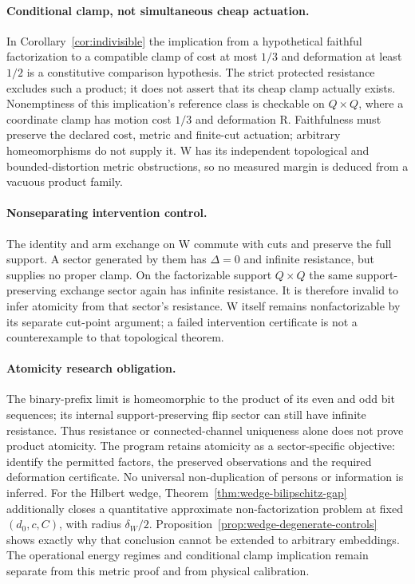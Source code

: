 \documentclass[11pt,a4paper]{article}
\theoremstyle{plain}
\theoremstyle{definition}
\theoremstyle{remark}
\begin{document}
\paragraph{Conditional clamp, not simultaneous cheap actuation.}
In Corollary~\ref{cor:indivisible} the implication from a hypothetical faithful
factorization to a compatible clamp of cost at most $1/3$ and deformation at
least $1/2$ is a constitutive comparison hypothesis. The strict protected
resistance excludes such a product; it does not assert that its cheap clamp
actually exists. Nonemptiness of this implication's reference class is
checkable on $Q\times Q$, where a coordinate clamp has motion cost $1/3$ and
deformation R. Faithfulness must preserve the declared cost, metric and
finite-cut actuation; arbitrary homeomorphisms do not supply it.
W has its independent topological and bounded-distortion metric obstructions,
so no measured margin is deduced from a vacuous product family.

\paragraph{Nonseparating intervention control.}
The identity and arm exchange on W commute with cuts and preserve the full
support. A sector generated by them has $\Delta=0$ and infinite resistance,
but supplies no proper clamp. On the factorizable support $Q\times Q$ the
same support-preserving exchange sector again has infinite resistance.
It is therefore invalid to infer atomicity from that sector's resistance.
W itself remains nonfactorizable by its separate cut-point argument; a failed
intervention certificate is not a counterexample to that topological theorem.

\paragraph{Atomicity research obligation.}
The binary-prefix limit is homeomorphic to the product of its even and odd bit sequences; its internal support-preserving flip sector can still have infinite resistance. Thus resistance or connected-channel uniqueness alone does not prove product atomicity. The program retains atomicity as a sector-specific objective: identify the permitted factors, the preserved observations and the required deformation certificate. No universal non-duplication of persons or information is inferred.
For the Hilbert wedge, Theorem~\ref{thm:wedge-bilipschitz-gap} additionally
closes a quantitative approximate non-factorization problem at fixed
$(d_0,c,C)$, with radius $\delta_W/2$. Proposition~\ref{prop:wedge-degenerate-controls}
shows exactly why that conclusion cannot be extended to arbitrary embeddings.
The operational energy regimes and conditional clamp implication remain
separate from this metric proof and from physical calibration.
\end{document}
